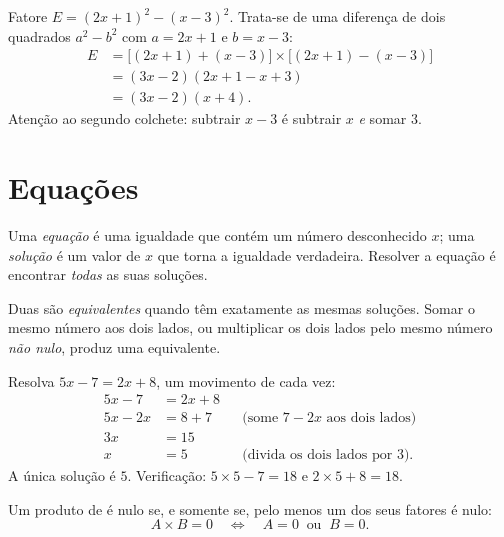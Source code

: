 \begin{example}\label{ex:g10:algebra:factorsteps}
Fatore $E = (2x + 1)^2 - (x - 3)^2$. Trata-se de uma diferença de dois
quadrados $a^2 - b^2$ com $a = 2x+1$ e $b = x-3$:
\begin{align*}
E &= \bigl[(2x+1) + (x-3)\bigr] \times \bigl[(2x+1) - (x-3)\bigr] \\
  &= (3x - 2)(2x + 1 - x + 3) \\
  &= (3x - 2)(x + 4).
\end{align*}
Atenção ao segundo colchete: subtrair $x - 3$ é subtrair $x$ \emph{e}
somar $3$.
\end{example}

\section{Equações}

\begin{definition}\label{def:g10:algebra:equation}
Uma \emph{equação} é uma igualdade que contém um número
desconhecido $x$; uma \emph{solução} é um valor de $x$ que torna a
igualdade verdadeira. Resolver a equação é encontrar \emph{todas} as suas
soluções.
\end{definition}

Duas  são \emph{equivalentes} quando têm exatamente as mesmas
soluções. Somar o mesmo número aos dois lados, ou multiplicar os dois
lados pelo mesmo número \emph{não nulo}, produz uma  equivalente.

\begin{example}\label{ex:g10:algebra:firstdegree}
Resolva $5x - 7 = 2x + 8$, um movimento de cada vez:
\begin{align*}
5x - 7 &= 2x + 8 \\
5x - 2x &= 8 + 7 && \text{(some $7 - 2x$ aos dois lados)} \\
3x &= 15 \\
x &= 5 && \text{(divida os dois lados por $3$).}
\end{align*}
A única solução é $5$. Verificação: $5 \times 5 - 7 = 18$ e
$2 \times 5 + 8 = 18$.
\end{example}

\begin{theorem}\label{thm:g10:algebra:zeroproduct}
Um produto de  é nulo se, e somente se, pelo menos um dos
seus fatores é nulo:
\[
A \times B = 0
\quad\Longleftrightarrow\quad
A = 0 \ \text{ ou } \ B = 0 .
\]
\end{theorem}

